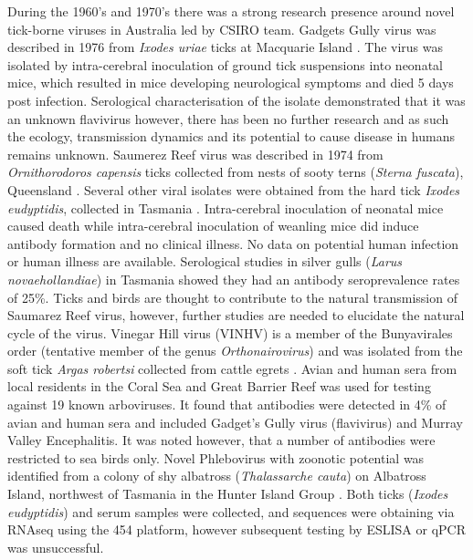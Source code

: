 \documentclass[a4paper, nobind]{templates/ociamthesis}
\begin{document}
During the 1960's and 1970's there was a strong research presence around novel tick-borne viruses in Australia led by CSIRO team.
Gadgets Gully virus was described in 1976 from \emph{Ixodes uriae} ticks at Macquarie Island \autocite{st.georgeIsolationArbovirusesIncluding1985}.
The virus was isolated by intra-cerebral inoculation of ground tick suspensions into neonatal mice, which resulted in mice developing neurological symptoms and died 5 days post infection.
Serological characterisation of the isolate demonstrated that it was an unknown flavivirus however, there has been no further research and as such the ecology, transmission dynamics and its potential to cause disease in humans remains unknown.
Saumerez Reef virus was described in 1974 from \emph{Ornithorodoros capensis} ticks collected from nests of sooty terns (\emph{Sterna fuscata}), Queensland \autocite{st.georgeIsolationSaumarezReef1977}.
Several other viral isolates were obtained from the hard tick \emph{Ixodes eudyptidis}, collected in Tasmania \autocite{st.georgeIsolationSaumarezReef1977}.
Intra-cerebral inoculation of neonatal mice caused death while intra-cerebral inoculation of weanling mice did induce antibody formation and no clinical illness.
No data on potential human infection or human illness are available.
Serological studies in silver gulls (\emph{Larus novaehollandiae}) in Tasmania showed they had an antibody seroprevalence rates of 25\%. Ticks and birds are thought to contribute to the natural transmission of Saumarez Reef virus, however, further studies are needed to elucidate the natural cycle of the virus.
Vinegar Hill virus (VINHV) is a member of the Bunyavirales order (tentative member of the genus \emph{Orthonairovirus}) and was isolated from the soft tick \emph{Argas robertsi} collected from cattle egrets \autocite{gauciGenomicCharacterisationVinegar2017}.
Avian and human sera from local residents in the Coral Sea and Great Barrier Reef was used for testing against 19 known arboviruses.
It found that antibodies were detected in 4\% of avian and human sera and included Gadget's Gully virus (flavivirus) and Murray Valley Encephalitis.
It was noted however, that a number of antibodies were restricted to sea birds only.
Novel Phlebovirus with zoonotic potential was identified from a colony of shy albatross (\emph{Thalassarche cauta}) on Albatross Island, northwest of Tasmania in the Hunter Island Group \autocite{wangNovelPhlebovirusZoonotic2014}.
Both ticks (\emph{Ixodes eudyptidis}) and serum samples were collected, and sequences were obtaining via RNAseq using the 454 platform, however subsequent testing by ESLISA or qPCR was unsuccessful.
\end{document}
